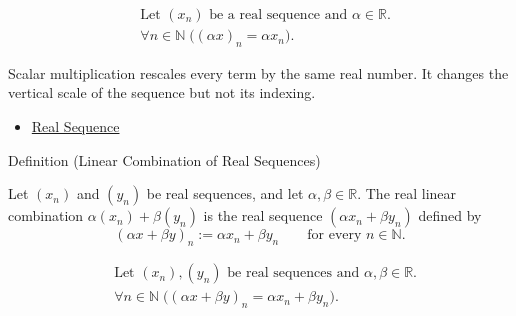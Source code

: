 \begin{remark*}
\[
\begin{aligned}
&\text{Let } (x_n) \text{ be a real sequence and } \alpha\in\mathbb{R}.\\
&\forall n\in\mathbb{N}\;\bigl((\alpha x)_n=\alpha x_n\bigr).
\end{aligned}
\]
\end{remark*}

\begin{remark*}[Interpretation]
Scalar multiplication rescales every term by the same real number. It changes
the vertical scale of the sequence but not its indexing.
\end{remark*}

\begin{dependencies}
\begin{itemize}
  \item \hyperref[def:real-sequence]{Real Sequence}
\end{itemize}
\end{dependencies}


\begin{definitionbox}{Definition (Linear Combination of Real Sequences)}
\begin{definition}
\label{def:linear-combination-of-real-sequences}
Let $(x_n)$ and $(y_n)$ be real sequences, and let
$\alpha,\beta\in\mathbb{R}$.  The real linear combination
$\alpha(x_n)+\beta(y_n)$ is the real sequence $(\alpha x_n+\beta y_n)$
defined by
\[
(\alpha x+\beta y)_n := \alpha x_n+\beta y_n
\qquad
\text{for every } n\in\mathbb{N}.
\]
\end{definition}
\end{definitionbox}

\begin{remark*}
\[
\begin{aligned}
&\text{Let } (x_n),(y_n) \text{ be real sequences and }
  \alpha,\beta\in\mathbb{R}.\\
&\forall n\in\mathbb{N}\;\bigl((\alpha x+\beta y)_n
  =\alpha x_n+\beta y_n\bigr).
\end{aligned}
\]
\end{remark*}

